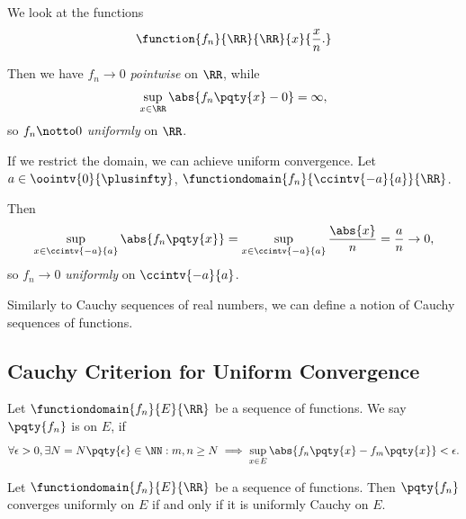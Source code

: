 \begin{example}
    We look at the functions
    \[
        \function{f_n}{\RR}{\RR}{x}{\frac{x}{n}.}
    \]

    Then we have \(f_n \to 0\) \emph{pointwise} on \(\RR\), while
    \[
        \sup_{x \in \RR} \abs{f_n\pqty{x} - 0} = \infty,
    \]
    so \(f_n \notto 0\) \emph{uniformly} on \(\RR\).

    If we restrict the domain, we can achieve uniform convergence. Let \(a \in \oointv{0}{\plusinfty}\), \(\functiondomain{f_n}{\ccintv{-a}{a}}{\RR}\).

    Then
    \[
        \sup_{x \in \ccintv{-a}{a}} \abs{f_n\pqty{x}} = \sup_{x \in \ccintv{-a}{a}} \frac{\abs{x}}{n} = \frac{a}{n} \to 0,
    \]
    so \(f_n \to 0\) \emph{uniformly} on \(\ccintv{-a}{a}\).
\end{example}

Similarly to Cauchy sequences of real numbers, we can define a notion of Cauchy sequences of functions.

\subsection{Cauchy Criterion for Uniform Convergence}

\begin{definition}
    Let \(\functiondomain{f_n}{E}{\RR}\) be a sequence of functions. We say \(\pqty{f_n}\) is  on \(E\), if
    \[
        \forall \epsilon > 0, \exists N = N\pqty{\epsilon} \in \NN: m, n \geq N \implies \sup_{x \in E} \abs{f_n\pqty{x} - f_m\pqty{x}} < \epsilon.
    \]
\end{definition}

\begin{theorem}
    \label{thm:cauchy-criterion-uniform-convergence}%
    Let \(\functiondomain{f_n}{E}{\RR}\) be a sequence of functions. Then \(\pqty{f_n}\) converges uniformly on \(E\) if and only if it is uniformly Cauchy on \(E\).
\end{theorem}

